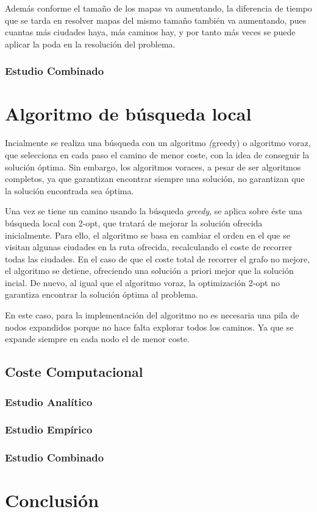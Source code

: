 \documentclass{uc3mpracticas}
\begin{document}
  Además conforme el tamaño de los mapas va aumentando, la diferencia de tiempo que se tarda en resolver mapas del mismo tamaño también va aumentando, pues cuantas más ciudades haya, más caminos hay, y por tanto más veces se puede aplicar la poda en la resolución del problema.

  \subsubsection{Estudio Combinado}


  \clearpage

  \section{Algoritmo de búsqueda local}

  Incialmente se realiza una búsqueda con un algoritmo \textit(greedy) o algoritmo voraz, que selecciona en cada paso el camino de menor coste, con la idea de conseguir la solución óptima. Sin embargo, los algoritmos voraces, a pesar de ser algoritmos completos, ya que garantizan encontrar siempre una solución, no garantizan que la solución encontrada sea óptima. 

  \vspace{2mm}

  Una vez se tiene un camino usando la búsqueda \textit{greedy}, se aplica sobre éste una búsqueda local con 2-opt, que tratará de mejorar la solución ofrecida inicialmente. Para ello, el algoritmo se basa en cambiar el orden en el que se visitan algunas ciudades en la ruta ofrecida, recalculando el coste de recorrer todas las ciudades. En el caso de que el coste total de recorrer el grafo no mejore, el algoritmo se detiene, ofreciendo una solución a priori mejor que la solución incial. De nuevo, al igual que el algoritmo voraz, la optimización 2-opt no garantiza encontrar la solución óptima al problema. 
  
  \vspace{2mm}

  En este caso, para la implementación del algoritmo no es necesaria una pila de nodos expandidos porque no hace falta explorar todos los caminos. Ya que se expande siempre en cada nodo el de menor coste. 


  

  \subsection{Coste Computacional}
  
  \subsubsection{Estudio Analítico}

  \subsubsection{Estudio Empírico}

  \subsubsection{Estudio Combinado}

  \clearpage

  \section{Conclusión}
  
\end{document}
